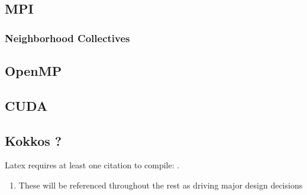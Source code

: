 \subsection{MPI}

\subsubsection{Neighborhood Collectives}

\subsection{OpenMP}

\subsection{CUDA}

\subsection{Kokkos ?}

Latex requires at least one citation to
compile: \cite{edwards2013kokkos}.

\begin{enumerate}
\item These will be referenced throughout the rest
as driving major design decisions
\end{enumerate}

